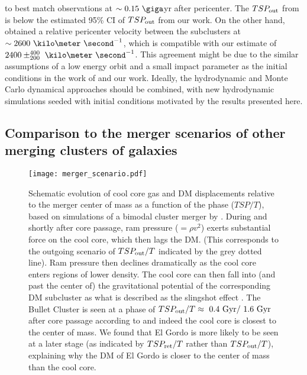 \documentclass[ucdthesis.tex]{subfiles}
\begin{document}
    to best match  observations at $\sim 0.15~\giga$yr after pericenter. 
    The $TSP_{\rm out}$ from \cite{Donnert13} is below the estimated 95\% CI of
    $TSP_{\rm out}$ from our work.
    On the other hand, \cite{Donnert13} obtained a
    relative pericenter velocity between the subclusters at $\sim
    2600~\kilo\meter~\second^{-1}$, which is compatible with our estimate of
    $2400\pm^{400}_{200}~\kilo\meter~\second^{-1}$.  
    This agreement might be due to the similar assumptions of a low
    energy orbit and a small impact parameter as the initial conditions in the
    work of \cite{Donnert13} and our work. 
    Ideally, the hydrodynamic and Monte Carlo dynamical approaches should be combined, with new hydrodynamic simulations seeded with initial conditions motivated by the results presented here.
    
    
    \subsection{Comparison to the merger scenarios of other merging clusters of galaxies}
    
    \begin{figure}
    	\texttt{[image: merger\_scenario.pdf]}
     \caption{Schematic evolution of cool core gas and DM displacements relative to the
    merger center of mass as a function of the phase ($TSP / T$), based on
    simulations of a bimodal cluster merger by \citet{Mathis05}. During and
    shortly after core passage, ram pressure ($=\rho v^2$) exerts substantial
    force on the cool core, which then lags the DM. (This corresponds to the
    outgoing scenario of $TSP_{\rm out} / T$ indicated by the grey dotted line). Ram
    pressure then declines dramatically as the cool core enters regions of
    lower density.  The cool core can then fall into (and past the center of)
    the gravitational potential of the corresponding DM subcluster as what is
    described as the slingshot effect \citep{Markevitch2007}.  The Bullet
    Cluster is seen at a phase of $TSP_{\rm out} / T \approx ~0.4\text{ Gyr} / ~1.6
    \text{ Gyr}$ after core passage according
    to  and indeed the cool core is closest to the center of
    mass. We found that El Gordo is more likely to be seen at a later stage (as
    indicated by $TSP_{\rm ret} / T$ rather than $TSP_{\rm out} / T$), explaining why the DM of
    El Gordo is closer to the center of mass than the cool core. \label{fig:merger_scenario}}
    \end{figure}
    	
\end{document}
